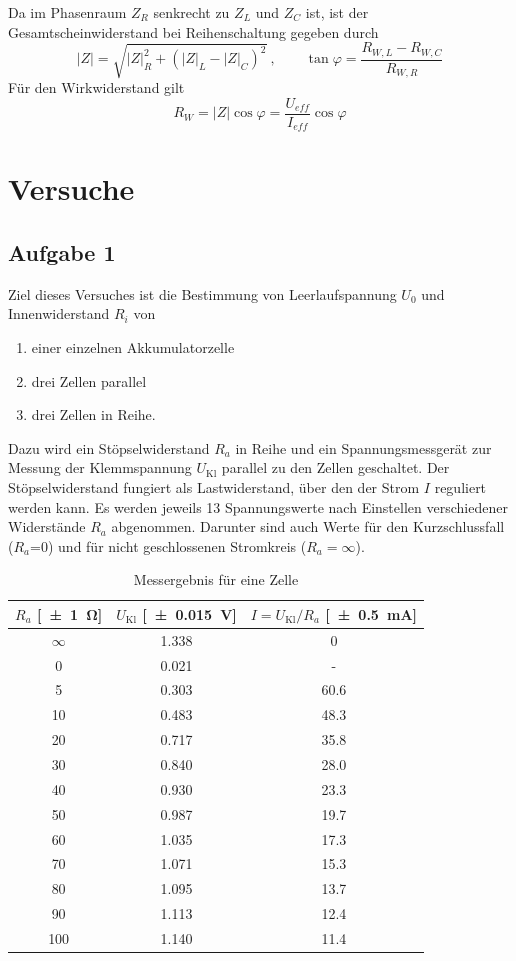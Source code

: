 Da im Phasenraum $ Z_{R} $ senkrecht zu $ Z_{L} $ und $ Z_{C} $ ist, ist der Gesamtscheinwiderstand bei Reihenschaltung gegeben durch
\begin{equation}
	|Z| = \sqrt{|Z|_{R}^2 + (|Z|_{L} - |Z|_{C})^2}~,\qquad \tan\varphi = \frac{R_{W,L} - R_{W,C}}{R_{W,R}} \label{eq:Induk}
\end{equation}
Für den Wirkwiderstand gilt
\begin{equation}
	R_W = |Z| \cos\varphi = \frac{U_{eff}}{I_{eff}} \cos\varphi \label{eq:wirkohm}
\end{equation}
\section{Versuche}
\subsection{Aufgabe 1}
Ziel dieses Versuches ist die Bestimmung von Leerlaufspannung $U_0$ und Innenwiderstand $R_i$ von
\begin{enumerate}
  \item einer einzelnen Akkumulatorzelle
  \item drei Zellen parallel
  \item drei Zellen in Reihe.
\end{enumerate}
Dazu wird ein Stöpselwiderstand $R_a$ in Reihe und ein Spannungsmessgerät zur Messung der Klemmspannung $U_{\text{Kl}}$ parallel zu den Zellen geschaltet. Der Stöpselwiderstand fungiert als Lastwiderstand, über den der Strom $I$ reguliert werden kann. Es werden jeweils 13 Spannungswerte nach Einstellen verschiedener Widerstände $R_a$ abgenommen. Darunter sind auch Werte für den Kurzschlussfall ($R_a$=0) und für nicht geschlossenen Stromkreis ($R_a=\infty$).
\begin{table}[H]
  \centering
  \begin{tabular}{c c c} \toprule
    $R_a$ [\SI{\pm1}{\ohm}] & $U_{\text{Kl}}$ [\SI{\pm .015}{V}] & $I=U_{\text{Kl}}/R_a$ [\SI{\pm .5}{mA}] \\ \midrule
    $\infty$ & \num{1.338} & 0 \\
    0 & \num{0.021} & - \\
    5 & \num{0.303} & \num{60.6} \\
    10 & \num{.483} & \num{48.3} \\
    20 & \num{.717} & \num{35.8} \\
    30 & \num{.840} & \num{28.0} \\
    40 & \num{.930} & \num{23.3} \\
    50 & \num{.987} & \num{19.7} \\
    60 & \num{1.035} & \num{17.3} \\
    70 & \num{1.071} & \num{15.3} \\
    80 & \num{1.095} & \num{13.7} \\
    90 & \num{1.113} & \num{12.4} \\
    100 & \num{1.140} & \num{11.4} \\ \bottomrule
  \end{tabular}
  \caption{Messergebnis für eine Zelle}
  \label{tab:einezelle}
\end{table}

